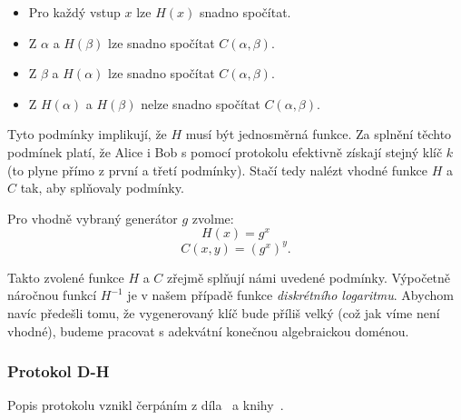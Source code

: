 \documentclass[
  program=infoi,
  biblatex=false,
  figures=true,
  glossaries,
  tables=false,
  sourcecodes=true,
  index
]{kidiplom}
\begin{document}
    \begin{itemize}
        \item
            Pro každý vstup $x$ lze $H(x)$ snadno spočítat.
        \item
            Z $\alpha$ a $H(\beta)$ lze snadno spočítat $C(\alpha,\beta)$.
        \item
            Z $\beta$ a $H(\alpha)$ lze snadno spočítat $C(\alpha,\beta)$.
        \item
            Z $H(\alpha)$ a $H(\beta)$ nelze snadno spočítat $C(\alpha,\beta)$.
    \end{itemize}

    Tyto podmínky implikují, že $H$ musí být jednosměrná funkce.
    Za splnění těchto podmínek platí, že Alice i Bob s pomocí protokolu efektivně získají
    stejný klíč $k$ (to plyne přímo z první a třetí podmínky).
    Stačí tedy nalézt vhodné funkce $H$ a $C$ tak, aby splňovaly podmínky.

    \medskip

    Pro vhodně vybraný generátor $g$ zvolme:
    \[
        H(x) = g^x
    \]
    \[
        C(x, y) = (g^x)^y.
    \]

    Takto zvolené funkce $H$ a $C$ zřejmě splňují námi uvedené podmínky.
    Výpočetně náročnou funkcí $H^{-1}$ je v našem případě funkce \emph{diskrétního logaritmu}.
    Abychom navíc předešli tomu, že vygenerovaný klíč bude příliš velký
    (což jak víme není vhodné), budeme pracovat s adekvátní konečnou algebraickou doménou.


    \subsubsection{Protokol D-H}

        Popis protokolu vznikl čerpáním z díla~\cite{graduate-course} a knihy~\cite{rsa-and-public}.
\end{document}

